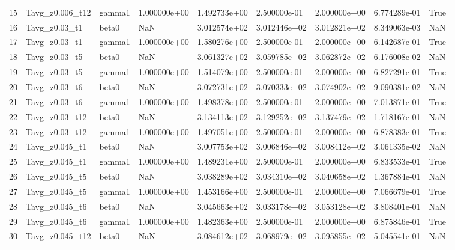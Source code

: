 \begin{tabular}{lllllllll}
15 &   Tavg_z0.006_t12 &    gamma1 & 1.000000e+00 & 1.492733e+00 & 2.500000e-01 & 2.000000e+00 & 6.774289e-01 &    True \\
16 &     Tavg_z0.03_t1 &     beta0 &          NaN & 3.012574e+02 & 3.012446e+02 & 3.012821e+02 & 8.349063e-03 &     NaN \\
17 &     Tavg_z0.03_t1 &    gamma1 & 1.000000e+00 & 1.580276e+00 & 2.500000e-01 & 2.000000e+00 & 6.142687e-01 &    True \\
18 &     Tavg_z0.03_t5 &     beta0 &          NaN & 3.061327e+02 & 3.059785e+02 & 3.062872e+02 & 6.176008e-02 &     NaN \\
19 &     Tavg_z0.03_t5 &    gamma1 & 1.000000e+00 & 1.514079e+00 & 2.500000e-01 & 2.000000e+00 & 6.827291e-01 &    True \\
20 &     Tavg_z0.03_t6 &     beta0 &          NaN & 3.072731e+02 & 3.070333e+02 & 3.074902e+02 & 9.090381e-02 &     NaN \\
21 &     Tavg_z0.03_t6 &    gamma1 & 1.000000e+00 & 1.498378e+00 & 2.500000e-01 & 2.000000e+00 & 7.013871e-01 &    True \\
22 &    Tavg_z0.03_t12 &     beta0 &          NaN & 3.134113e+02 & 3.129252e+02 & 3.137479e+02 & 1.718167e-01 &     NaN \\
23 &    Tavg_z0.03_t12 &    gamma1 & 1.000000e+00 & 1.497051e+00 & 2.500000e-01 & 2.000000e+00 & 6.878383e-01 &    True \\
24 &    Tavg_z0.045_t1 &     beta0 &          NaN & 3.007753e+02 & 3.006846e+02 & 3.008412e+02 & 3.061335e-02 &     NaN \\
25 &    Tavg_z0.045_t1 &    gamma1 & 1.000000e+00 & 1.489231e+00 & 2.500000e-01 & 2.000000e+00 & 6.833533e-01 &    True \\
26 &    Tavg_z0.045_t5 &     beta0 &          NaN & 3.038289e+02 & 3.034310e+02 & 3.040658e+02 & 1.367884e-01 &     NaN \\
27 &    Tavg_z0.045_t5 &    gamma1 & 1.000000e+00 & 1.453166e+00 & 2.500000e-01 & 2.000000e+00 & 7.066679e-01 &    True \\
28 &    Tavg_z0.045_t6 &     beta0 &          NaN & 3.045663e+02 & 3.033178e+02 & 3.053128e+02 & 3.808401e-01 &     NaN \\
29 &    Tavg_z0.045_t6 &    gamma1 & 1.000000e+00 & 1.482363e+00 & 2.500000e-01 & 2.000000e+00 & 6.875846e-01 &    True \\
30 &   Tavg_z0.045_t12 &     beta0 &          NaN & 3.084612e+02 & 3.068979e+02 & 3.095855e+02 & 5.045541e-01 &     NaN \\

\end{tabular}
